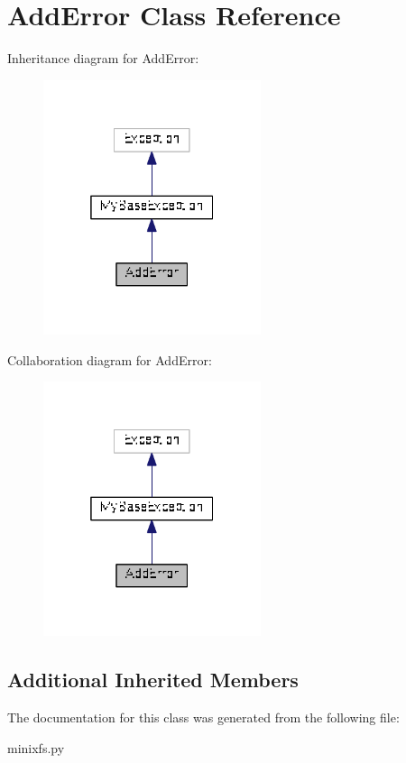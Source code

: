 \hypertarget{classminixfs_1_1_add_error}{}\section{Add\+Error Class Reference}
\label{classminixfs_1_1_add_error}


Inheritance diagram for Add\+Error\+:
\nopagebreak
\begin{figure}[H]
\begin{center}
\leavevmode
\includegraphics[width=181pt]{classminixfs_1_1_add_error__inherit__graph}
\end{center}
\end{figure}


Collaboration diagram for Add\+Error\+:
\nopagebreak
\begin{figure}[H]
\begin{center}
\leavevmode
\includegraphics[width=181pt]{classminixfs_1_1_add_error__coll__graph}
\end{center}
\end{figure}
\subsection*{Additional Inherited Members}


The documentation for this class was generated from the following file\+:\begin{DoxyCompactItemize}
\item 
minixfs.\+py\end{DoxyCompactItemize}
